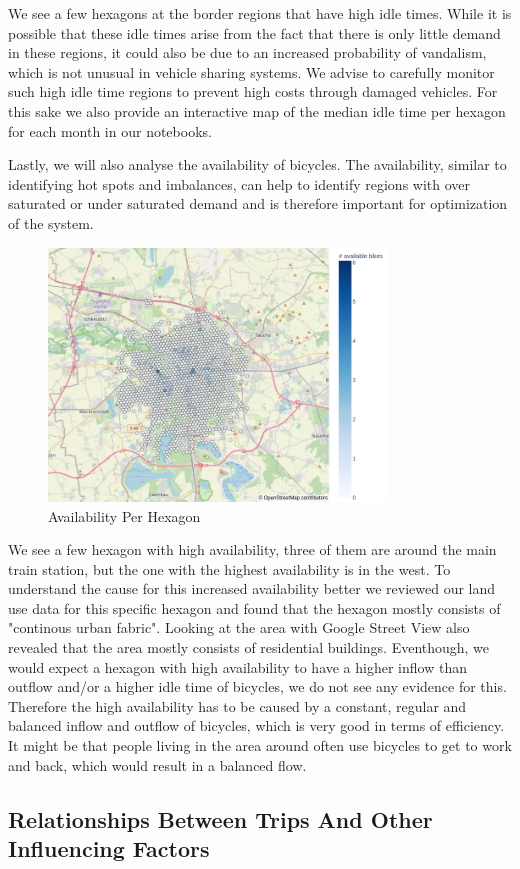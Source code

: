We see a few hexagons at the border regions that have high idle times. 
While it is possible that these idle times arise from the fact that there is only little demand in these regions, it could also be due to an increased probability of vandalism, which is not unusual in vehicle sharing systems.
We advise to carefully monitor such high idle time regions to prevent high costs through damaged vehicles.
For this sake we also provide an interactive map of the median idle time per hexagon for each month in our notebooks.

Lastly, we will also analyse the availability of bicycles. The availability,
similar to identifying hot spots and imbalances, can help to identify regions
with over saturated or under saturated demand and is therefore important for
optimization of the system.


\begin{figure}[htb]
    \centering
    \includegraphics[width=0.8\textwidth]{Figures/descriptive_analysis/availability_per_hexagon.png}
    \caption{Availability Per Hexagon}
    \label{fig:descriptive_analysis_availability_per_hexagon}
\end{figure}

We see a few hexagon with high availability, three of them are around the main
train station, but the one with the highest availability is in the west. To
understand the cause for this increased availability better we reviewed our
land use data for this specific hexagon and found that the hexagon mostly
consists of "continous urban fabric". Looking at the area with Google Street
View also revealed that the area mostly consists of residential buildings.
Eventhough, we would expect a hexagon with high availability to have a higher
inflow than outflow and/or a higher idle time of bicycles, we do not see any
evidence for this. Therefore the high availability has to be caused by a constant,
regular and balanced inflow and outflow of bicycles, which is very good in
terms of efficiency. It might be that people living in the area around often
use bicycles to get to work and back, which would result in a balanced flow.


\subsection{Relationships Between Trips And Other Influencing Factors}
\label{subsec:descriptive_analysis_relationships}
